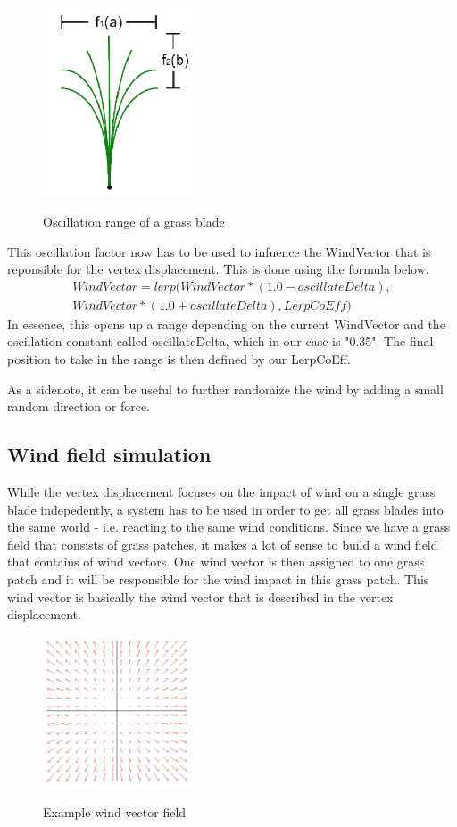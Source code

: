 \documentclass[conference]{acmsiggraph}
\begin{document}
 \begin{figure}[ht]
   \centering
   \includegraphics[width=1.75in]{images/oscillation}
   \caption{Oscillation range of a grass blade} \cite{EddieLee}
 \end{figure}

This oscillation factor now has to be used to infuence the WindVector that is reponsible for the vertex displacement. This is done using the formula below.
\begin{equation}
\begin{split}
WindVector = lerp(WindVector * (1.0 - oscillateDelta), \\ 
WindVector * (1.0 + oscillateDelta), LerpCoEff)
\end{split}
\end{equation}
In essence, this opens up a range depending on the current WindVector and the oscillation constant called oscillateDelta, which in our case is "0.35". The final position to take in the range is then defined by our LerpCoEff.

As a sidenote, it can be useful to further randomize the wind by adding a small random direction or force.

\subsection{Wind field simulation}
While the vertex displacement focuses on the impact of wind on a single grass blade indepedently, a system has to be used in order to get all grass blades into the same world - i.e. reacting to the same wind conditions. Since we have a grass field that consists of grass patches, it makes a lot of sense to build a wind field that contains of wind vectors. One wind vector is then assigned to one grass patch and it will be responsible for the wind impact in this grass patch. This wind vector is basically the wind vector that is described in the vertex displacement.

 \begin{figure}[ht]
   \centering
   \includegraphics[width=1.75in]{images/windField}
   \caption{Example wind vector field} \cite{EddieLee}
 \end{figure}
 
\end{document}
